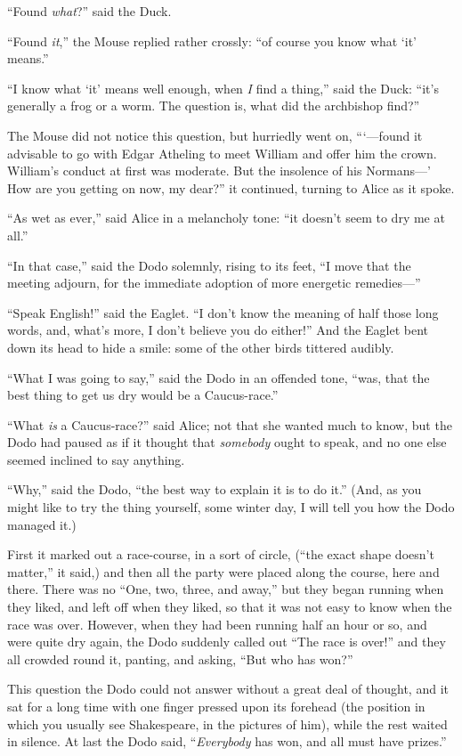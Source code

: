 \documentclass[11pt,openany,oneside]{book}
\begin{document}
“Found {\em what\/}?” said the Duck. 

“Found {\em it\/},” the Mouse replied rather crossly: “of course you know what ‘it’ means.” 

“I know what ‘it’ means well enough, when {\em I\/} find a thing,” said the Duck: “it’s generally a frog or a worm. The question is, what did the archbishop find?” 

The Mouse did not notice this question, but hurriedly went on, “‘—found it advisable to go with Edgar Atheling to meet William and offer him the crown. William’s conduct at first was moderate. But the insolence of his Normans—’ How are you getting on now, my dear?” it continued, turning to Alice as it spoke. 

“As wet as ever,” said Alice in a melancholy tone: “it doesn’t seem to dry me at all.” 

“In that case,” said the Dodo solemnly, rising to its feet, “I move that the meeting adjourn, for the immediate adoption of more energetic remedies—” 

“Speak English!” said the Eaglet. “I don’t know the meaning of half those long words, and, what’s more, I don’t believe you do either!” And the Eaglet bent down its head to hide a smile: some of the other birds tittered audibly. 

“What I was going to say,” said the Dodo in an offended tone, “was, that the best thing to get us dry would be a Caucus-race.” 

“What {\em is\/} a Caucus-race?” said Alice; not that she wanted much to know, but the Dodo had paused as if it thought that {\em somebody\/} ought to speak, and no one else seemed inclined to say anything. 

“Why,” said the Dodo, “the best way to explain it is to do it.” (And, as you might like to try the thing yourself, some winter day, I will tell you how the Dodo managed it.) 

First it marked out a race-course, in a sort of circle, (“the exact shape doesn’t matter,” it said,) and then all the party were placed along the course, here and there. There was no “One, two, three, and away,” but they began running when they liked, and left off when they liked, so that it was not easy to know when the race was over. However, when they had been running half an hour or so, and were quite dry again, the Dodo suddenly called out “The race is over!” and they all crowded round it, panting, and asking, “But who has won?” 

This question the Dodo could not answer without a great deal of thought, and it sat for a long time with one finger pressed upon its forehead (the position in which you usually see Shakespeare, in the pictures of him), while the rest waited in silence. At last the Dodo said, “{\em Everybody\/} has won, and all must have prizes.” 
\end{document}
